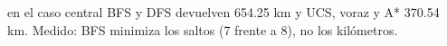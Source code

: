 {en el caso central BFS y DFS devuelven 654.25 km y UCS, voraz y A* 370.54 km.}
{Medido: BFS minimiza los saltos (7 frente a 8), no los kilómetros.}
